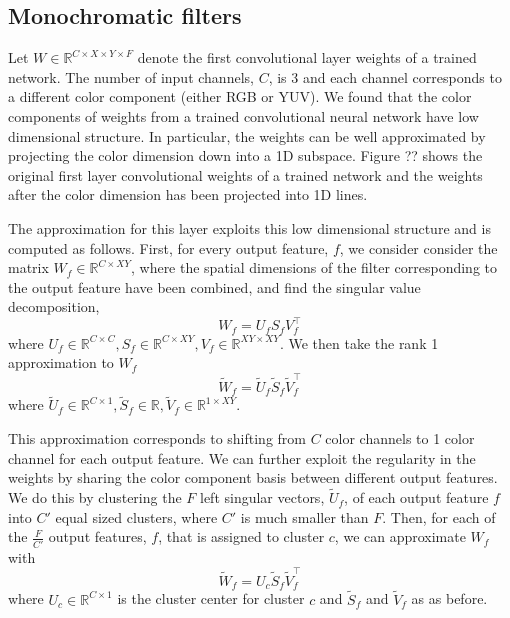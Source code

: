 
\subsection{Monochromatic filters}
Let $W \in \mathbb{R}^{C \times X \times Y \times F}$ denote the first convolutional layer weights of a trained network. The number of input channels, $C$, is 3 and each channel corresponds to a different color component (either RGB or YUV). We found that the color components of weights from a trained convolutional neural network have low dimensional structure. In particular, the weights can be well approximated by projecting the color dimension down into a 1D subspace. Figure ?? shows the original first layer convolutional weights of a trained network and the weights after the color dimension has been projected into 1D lines. 

The approximation for this layer exploits this low dimensional structure and is computed as follows. First, for every output feature, $f$, we consider consider the matrix $W_f \in \mathbb{R}^{C \times XY }$, where the spatial dimensions of the filter corresponding to the output feature have been combined, and find the singular value decomposition, 
\begin{equation*}
	W_f = U_f S_f V_f^{\top}
\end{equation*}
where $U_f \in \mathbb{R}^{C \times C}, S_f \in \mathbb{R}^{C \times XY}, V_f \in \mathbb{R}^{XY \times XY}$. We then take the rank 1 approximation to $W_f$ 
\begin{equation*}
	\tilde{W}_f = \tilde{U}_f \tilde{S}_f \tilde{V}_f^{\top}
\end{equation*}
where $\tilde{U}_f \in \mathbb{R}^{C \times 1}, \tilde{S}_f \in \mathbb{R}, \tilde{V}_f \in \mathbb{R}^{1 \times XY}$.

This approximation corresponds to shifting from $C$ color channels to 1 color channel for each output feature. We can further exploit the regularity in the weights by sharing the color component basis between different output features. We do this by clustering the $F$ left singular vectors,  $\tilde{U}_f$, of each output feature $f$ into $C'$ equal sized clusters, where $C'$ is much smaller than $F$. Then, for each of the $\frac{F}{C'}$ output features, $f$, that is assigned to cluster $c$, we can approximate $W_f$ with
\begin{equation*}
	\tilde{W}_f = U_c \tilde{S}_f \tilde{V}_f^{\top}
\end{equation*}
where $U_c \in \mathbb{R}^{C \times 1}$ is the cluster center for cluster $c$ and $\tilde{S}_f$ and $\tilde{V}_f$ as as before. 

